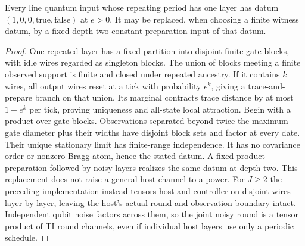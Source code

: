\begin{lemma}\label{lem:line-periodone}
Every line quantum input whose repeating period has one layer has
datum $(1,0,0,\mathrm{true},\mathrm{false})$ at $e>0$.
It may be replaced, when choosing a finite witness datum, by a fixed
depth-two constant-preparation input of that datum.
\end{lemma}
\begin{proof}
One repeated layer has a fixed partition into disjoint finite gate
blocks, with idle wires regarded as singleton blocks. The union of
blocks meeting a finite observed support is finite and closed under
repeated ancestry. If it contains $k$ wires, all output wires reset
at a tick with probability $e^k$, giving a trace-and-prepare branch
on that union. Its marginal contracts trace distance by at most
$1-e^k$ per tick, proving uniqueness and all-state local attraction.
Begin with a product over gate blocks. Observations separated beyond
twice the maximum gate diameter plus their widths have disjoint
block sets and factor at every date. Their unique stationary limit
has finite-range independence. It has no covariance order or
nonzero Bragg atom, hence the stated datum. A fixed product
preparation followed by noisy layers realizes the same datum at
depth two. This replacement does not raise a general host channel
to a power. For $J\ge2$ the preceding implementation instead tensors
host and controller on disjoint wires layer by layer, leaving the
host's actual round and observation boundary intact. Independent
qubit noise factors across them, so the joint noisy round is a tensor
product of TI round channels, even if individual host layers use
only a periodic schedule.
\end{proof}
